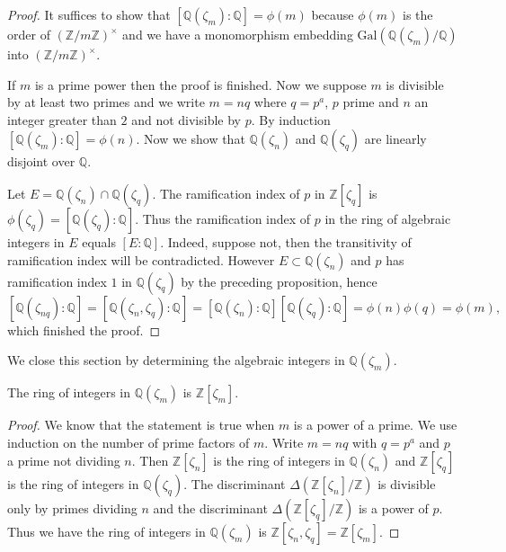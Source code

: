 \begin{proof}
It suffices to show that $[\mathbb{Q}(\zeta_m):\mathbb{Q}]=\phi(m)$ because $\phi(m)$ is the order of $(\mathbb{Z}/m\mathbb{Z})^\times$ and we have a monomorphism embedding $\mathrm{Gal}(\mathbb{Q}(\zeta_m)/\mathbb{Q})$ into $(\mathbb{Z}/m\mathbb{Z})^\times$.\par
If $m$ is a prime power then the proof is finished. Now we suppose $m$ is divisible by at least two primes and we write $m=nq$ where $q=p^a$, $p$ prime and $n$ an integer greater than $2$ and not divisible by $p$. By induction $[\mathbb{Q}(\zeta_m):\mathbb{Q}]=\phi(n)$. Now we show that $\mathbb{Q}(\zeta_n)$ and $\mathbb{Q}(\zeta_q)$ are linearly disjoint over $\mathbb{Q}$.\par
Let $E=\mathbb{Q}(\zeta_n)\cap\mathbb{Q}(\zeta_q)$. The ramification index of $p$ in $\mathbb{Z}[\zeta_q]$ is $\phi(\zeta_q)=[\mathbb{Q}(\zeta_q):\mathbb{Q}]$. Thus the ramification index of $p$ in the ring of algebraic integers in $E$ equals $[E:\mathbb{Q}]$. Indeed, suppose not, then the transitivity of ramification index will be contradicted. However $E\subset\mathbb{Q}(\zeta_n)$ and $p$ has ramification index $1$ in $\mathbb{Q}(\zeta_q)$ by the preceding proposition, hence 
$$
\left[ \mathbb{Q} \left( \zeta _{nq} \right) :\mathbb{Q} \right] =\left[ \mathbb{Q} \left( \zeta _n,\zeta _q \right) :\mathbb{Q} \right] =\left[ \mathbb{Q} \left( \zeta _n \right) :\mathbb{Q} \right] \left[ \mathbb{Q} \left( \zeta _q \right) :\mathbb{Q} \right] =\phi \left( n \right) \phi \left( q \right) =\phi \left( m \right) ,
$$
which finished the proof.
\end{proof}
We close this section by determining the algebraic integers in $\mathbb{Q}(\zeta_m)$.
\begin{theorem}
The ring of integers in $\mathbb{Q}(\zeta_m)$ is $\mathbb{Z}[\zeta_m]$.
\end{theorem}
\begin{proof}
We know that the statement is true when $m$ is a power of a prime. We use induction on the number of prime factors of $m$. Write $m=nq$ with $q=p^a$ and $p$ a prime not dividing $n$. Then $\mathbb{Z}[\zeta_n]$ is the ring of integers in $\mathbb{Q}(\zeta_n)$ and $\mathbb{Z}[\zeta_q]$ is the ring of integers in $\mathbb{Q}(\zeta_q)$. The discriminant $\Delta(\mathbb{Z}[\zeta_n]/\mathbb{Z})$ is divisible only by primes dividing $n$ and the discriminant $\Delta(\mathbb{Z}[\zeta_q]/\mathbb{Z})$ is a power of $p$. Thus we have the ring of integers in $\mathbb{Q}(\zeta_m)$ is $\mathbb{Z}[\zeta_n,\zeta_q]=\mathbb{Z}[\zeta_m]$.
\end{proof}
